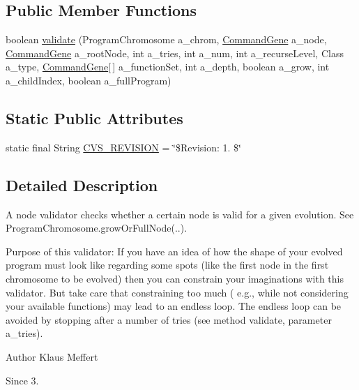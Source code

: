 \subsection*{Public Member Functions}
\begin{DoxyCompactItemize}
\item 
boolean \hyperlink{interfaceorg_1_1jgap_1_1gp_1_1_i_node_validator_abee811a7be92e3cb4ed4f47370479f74}{validate} (Program\-Chromosome a\-\_\-chrom, \hyperlink{classorg_1_1jgap_1_1gp_1_1_command_gene}{Command\-Gene} a\-\_\-node, \hyperlink{classorg_1_1jgap_1_1gp_1_1_command_gene}{Command\-Gene} a\-\_\-root\-Node, int a\-\_\-tries, int a\-\_\-num, int a\-\_\-recurse\-Level, Class a\-\_\-type, \hyperlink{classorg_1_1jgap_1_1gp_1_1_command_gene}{Command\-Gene}\mbox{[}$\,$\mbox{]} a\-\_\-function\-Set, int a\-\_\-depth, boolean a\-\_\-grow, int a\-\_\-child\-Index, boolean a\-\_\-full\-Program)
\end{DoxyCompactItemize}
\subsection*{Static Public Attributes}
\begin{DoxyCompactItemize}
\item 
static final String \hyperlink{interfaceorg_1_1jgap_1_1gp_1_1_i_node_validator_a15abecd09c27a7c9cee7ed7e6d0f095e}{C\-V\-S\-\_\-\-R\-E\-V\-I\-S\-I\-O\-N} = \char`\"{}\$Revision\-: 1. \$\char`\"{}
\end{DoxyCompactItemize}


\subsection{Detailed Description}
A node validator checks whether a certain node is valid for a given evolution. See Program\-Chromosome.\-grow\-Or\-Full\-Node(..).

Purpose of this validator\-: If you have an idea of how the shape of your evolved program must look like regarding some spots (like the first node in the first chromosome to be evolved) then you can constrain your imaginations with this validator. But take care that constraining too much ( e.\-g., while not considering your available functions) may lead to an endless loop. The endless loop can be avoided by stopping after a number of tries (see method validate, parameter a\-\_\-tries).

\begin{DoxyAuthor}{Author}
Klaus Meffert 
\end{DoxyAuthor}
\begin{DoxySince}{Since}
3. 
\end{DoxySince}


